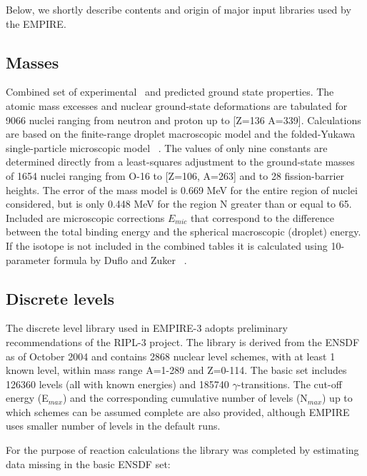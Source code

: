 Below, we shortly describe contents and origin of major input libraries used
by the EMPIRE.

\subsection{Masses}

Combined set of experimental~\cite{Audi} and predicted ground state
properties. The atomic mass excesses and nuclear ground-state deformations
are tabulated for 9066 nuclei ranging from neutron and proton up to {[}Z=136
A=339{]}. Calculations are based on the finite-range droplet macroscopic
model and the folded-Yukawa single-particle microscopic model~\cite{Moller95}%
. The values of only nine constants are determined directly from a
least-squares adjustment to the ground-state masses of 1654 nuclei ranging
from O-16 to {[}Z=106, A=263{]} and to 28 fission-barrier heights. The error
of the mass model is 0.669 MeV for the entire region of nuclei considered,
but is only 0.448 MeV for the region N greater than or equal to 65. Included
are microscopic corrections $E_{mic}$ that correspond to the difference
between the total binding energy and the spherical macroscopic (droplet)
energy. If the isotope is not included in the combined tables it is
calculated using 10-parameter formula by Duflo and Zuker ~\cite{Duflo:96}.

\subsection{Discrete levels}

The discrete level library used in EMPIRE-3 adopts preliminary
recommendations of the RIPL-3 project. The library is derived from the ENSDF
as of October 2004 and contains 2868 nuclear level schemes, with at least 1
known level, within mass range A=1-289 and Z=0-114. The basic set includes
126360 levels (all with known energies) and 185740 $\gamma$-transitions. The
cut-off energy (E$_{{max}}$) and the corresponding cumulative number of
levels (N$_{{max}}$) up to which schemes can be assumed complete are also
provided, although EMPIRE uses smaller number of levels in the default runs.

For the purpose of reaction calculations the library was completed by
estimating data missing in the basic ENSDF set:

